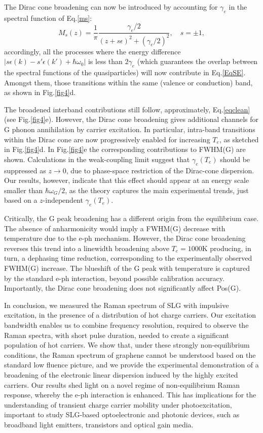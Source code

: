 \documentclass[aps, prl,twocolumn]{revtex4}
\begin{document}
The Dirac cone broadening can now be introduced by accounting for $\gamma_{e}$ in the spectral function of Eq.\ref{ms}:
\begin{equation}
\label{ms2}
M_s(z)=\frac{1}{\pi}\frac{\gamma_e/2}{(z+s\epsilon)^2+(\gamma_e/2)^2}, \quad s=\pm1,
\end{equation}
accordingly, all the processes where the energy difference $|s\epsilon(k)-s'\epsilon(k')+\hbar\omega_0|$ is less than $2\gamma_e$ (which guarantees the overlap between the spectral functions of the quasiparticles) will now contribute in Eq.\ref{EqSE}. Amongst them, those transitions within the same (valence or conduction) band, as shown in Fig.\ref{fig4}d.

The broadened interband contributions still follow, approximately, Eq.\ref{eqclean} (see Fig.\ref{fig4}e). However, the Dirac cone broadening gives additional channels for G phonon annihilation by carrier excitation. In particular, intra-band transitions within the Dirac cone are now progressively enabled for increasing $T_e$, as sketched in Fig.\ref{fig4}d. In Fig.\ref{fig4}e the corresponding contributions to FWHM(G) are shown. Calculations in the weak-coupling limit\cite{Schutt2011} suggest that $\gamma_e(T_e)$ should be suppressed as $z\rightarrow 0$, due to phase-space restriction of the Dirac-cone dispersion. Our results, however, indicate that this effect should appear at an energy scale smaller than $\hbar\omega_G/2$, as the theory captures the main experimental trends, just based on a $z$-independent $\gamma_e(T_e)$.

Critically, the G peak broadening has a different origin from the equilibrium case\cite{Baladin2008}. The absence of anharmonicity would imply a FWHM(G) decrease with temperature due to the e-ph mechanism. However, the Dirac cone broadening reverses this trend into a linewidth broadening above $T_e=1000$K producing, in turn, a dephasing time reduction, corresponding to the experimentally observed FWHM(G) increase. The blueshift of the G peak with temperature is captured by the standard e-ph interaction, beyond possible calibration accuracy. Importantly, the Dirac cone broadening does not significantly affect Pos(G).

In conclusion, we measured the Raman spectrum of SLG with impulsive excitation, in the presence of a distribution of hot charge carriers. Our excitation bandwidth enables us to combine frequency resolution, required to observe the Raman spectra, with short pulse duration, needed to create a significant population of hot carriers. We show that, under these strongly non-equilibrium conditions, the Raman spectrum of graphene cannot be understood based on the standard low fluence picture, and we provide the experimental demonstration of a broadening of the electronic linear dispersion induced by the highly excited carriers. Our results shed light on a novel regime of non-equilibrium Raman response, whereby the e-ph interaction is enhanced. This has implications for the understanding of transient charge carrier mobility under photoexcitation, important to study SLG-based optoelectronic and photonic devices\cite{PhysRevB.93.075410,Mogulkoc201485}, such as broadband light emitters\cite{kim_bright_2015}, transistors and optical gain media\cite{engel_lightmatter_2012}.
\end{document}
